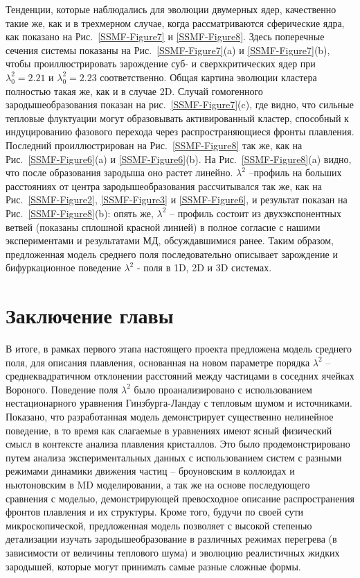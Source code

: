 Тенденции, которые наблюдались для эволюции двумерных ядер, качественно такие же, как и в трехмерном случае, когда рассматриваются сферические ядра, как показано на Рис.~\ref{SSMF-Figure7} и \ref{SSMF-Figure8}. Здесь поперечные сечения системы показаны на Рис.~\ref{SSMF-Figure7}(a) и \ref{SSMF-Figure7}(b), чтобы проиллюстрировать зарождение суб- и сверхкритических ядер при $\lambda_0^2 = 2.21$ и $\lambda_0^2 = 2.23$ соответственно.
Общая картина эволюции кластера полностью такая же, как и в случае 2D. Случай гомогенного зародышеобразования показан на рис.~\ref{SSMF-Figure7}(c), где видно, что сильные тепловые флуктуации могут образовывать активированный кластер, способный к индуцированию фазового перехода через распространяющиеся фронты плавления. Последний проиллюстрирован на Рис.~\ref{SSMF-Figure8} так же, как на Рис.~\ref{SSMF-Figure6}(a) и \ref{SSMF-Figure6}(b).
На Рис.~\ref{SSMF-Figure8}(a) видно, что после образования зародыша оно растет линейно. $\lambda ^ 2$ --профиль на больших расстояниях от центра зародышеобразования рассчитывался так же, как на Рис.~\ref{SSMF-Figure2}, \ref{SSMF-Figure3} и \ref{SSMF-Figure6}, и результат показан на Рис.~\ref{SSMF-Figure8}(b): опять же, $\lambda ^ 2$ -- профиль состоит из двухэкспонентных ветвей (показаны сплошной красной линией) в полное согласие с нашими экспериментами и результатами МД, обсуждавшимися ранее. Таким образом, предложенная модель среднего поля последовательно описывает зарождение и бифуркационное поведение $\lambda ^ 2$ - поля в 1D, 2D и 3D системах.

\section{Заключение главы}

В итоге, в рамках первого этапа настоящего проекта предложена модель среднего поля, для описания  плавления, основанная на новом параметре порядка $\lambda^2$ -- среднеквадратичном отклонении расстояний между частицами в соседних ячейках Вороного.
Поведение поля $\lambda^2$ было проанализировано с использованием нестационарного уравнения Гинзбурга-Ландау с тепловым шумом и источниками.
Показано, что разработанная модель демонстрирует существенно нелинейное поведение, в то время как слагаемые в уравнениях имеют ясный физический смысл в контексте анализа плавления кристаллов.
Это было продемонстрировано путем анализа экспериментальных данных с использованием систем с разными режимами динамики движения частиц -- броуновским в коллоидах и ньютоновским в MD моделировании, а так же на основе последующего сравнения с моделью, демонстрирующей превосходное описание распространения фронтов плавления и их структуры.
Кроме того, будучи по своей сути микроскопической, предложенная модель позволяет с высокой степенью детализации изучать зародышеобразование в различных режимах перегрева (в зависимости от величины теплового шума) и эволюцию реалистичных жидких зародышей, которые могут принимать самые разные сложные формы.

